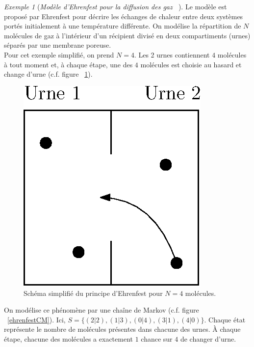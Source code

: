 \documentclass[12pt,a4paper]{report}
\theoremstyle{definition}%
\theoremstyle{remark}
\newtheorem{example}{Exemple}[chapter]
\newcommand{\cf}{c.f. }
\begin{document}
\begin{example}[\textit{Modèle d'Ehrenfest pour la diffusion des gaz ~\cite{Course3}}]
	Le modèle est proposé par Ehrenfest pour décrire les échanges de chaleur entre deux systèmes portés initialement à une température différente. On modélise la répartition de $N$ molécules de gaz à l'intérieur d'un récipient divisé en deux compartiments (urnes) séparés par une membrane poreuse.\\
	Pour cet exemple simplifié, on prend $N = 4$. Les 2 urnes contiennent $4$ molécules à tout moment et, à chaque étape, une des $4$ molécules est choisie au hasard et change d'urne (\cf figure ~\ref{ehrenfestscheme}).
	\begin{figure}[H]
		\centering
		\includegraphics[scale=0.5]{figures/EhrenfestUrne.eps}
		\caption{Schéma simplifié du principe d'Ehrenfest pour $N=4$ molécules.}
		\label{ehrenfestscheme}
	\end{figure}

	On modélise ce phénomène par une chaîne de Markov (\cf figure ~\ref{ehrenfestCM}). Ici, $S=\{(2|2), (1|3), (0|4), (3|1), (4|0) \}$. Chaque état représente le nombre de molécules présentes dans chacune des urnes. \`A chaque étape, chacune des molécules a exactement $1$ chance sur $4$ de changer d'urne.


\end{example}
\end{document}
